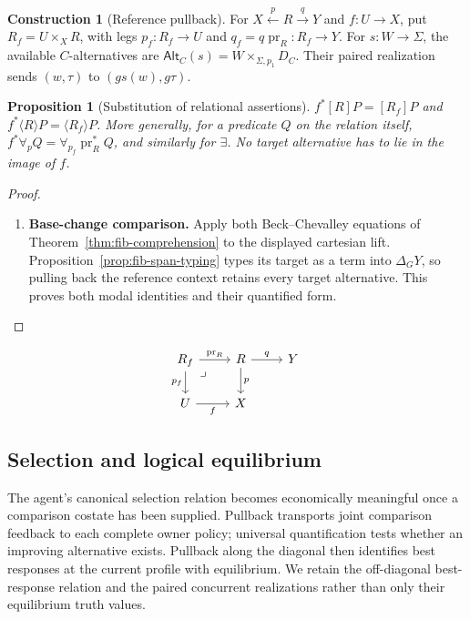 \documentclass[11pt,a4paper]{article}
\numberwithin{equation}{section}
\newtheorem{proposition}[theorem]{Proposition}
\theoremstyle{definition}
\newtheorem{construction}[construction]{Construction}
\theoremstyle{remark}
\theoremstyle{plain}
\begin{document}
\begin{construction}[Reference pullback]
For $X\xleftarrow pR\xrightarrow qY$ and $f:U\to X$, put
$R_f=U\times_XR$, with legs $p_f:R_f\to U$ and
$q_f=q\operatorname{pr}_R:R_f\to Y$.
For $s:W\to\Sigma$, the available $C$-alternatives are
$\mathsf{Alt}_C(s)=W\times_{\Sigma,p_1}D_C$.
Their paired realization sends $(w,\tau)$ to $(gs(w),g\tau)$.
\end{construction}

\begin{proposition}[Substitution of relational assertions]
\label{prop:egt-reference-bc}
$f^*[R]P=[R_f]P$ and
$f^*\langle R\rangle P=\langle R_f\rangle P$.
More generally, for a predicate $Q$ on the relation itself,
$f^*\forall_pQ=\forall_{p_f}\operatorname{pr}_R^*Q$, and similarly for
$\exists$. No target alternative has to lie in the image of $f$.
\end{proposition}
\begin{proof}
\leavevmode
\begin{enumerate}[label=\textup{(\arabic*)},leftmargin=*,itemsep=4pt,topsep=3pt]
  \item \textbf{Base-change comparison.} Apply both Beck--Chevalley equations of
Theorem~\ref{thm:fib-comprehension} to the displayed cartesian lift. Proposition~\ref{prop:fib-span-typing} types its target as a term into
$\Delta_GY$, so pulling back the reference context retains every target
alternative. This proves both modal identities and their quantified form.
\end{enumerate}
\end{proof}

\[
\begin{tikzcd}
 R_f\arrow[r,"\operatorname{pr}_R"]\arrow[d,"p_f"']
 \arrow[dr,phantom,"\lrcorner",very near start]&R\arrow[d,"p"]\arrow[r,"q"]&Y\\
 U\arrow[r,"f"']&X&
\end{tikzcd}
\]

\subsection{Selection and logical equilibrium}
\label{sec:egt-equilibrium}

The agent's canonical selection relation becomes economically meaningful
once a comparison costate has been supplied. Pullback transports joint
comparison feedback to each complete owner policy; universal
quantification tests whether an improving alternative exists. Pullback
along the diagonal then identifies best responses at the current profile
with equilibrium. We retain the off-diagonal best-response relation and
the paired concurrent realizations rather than only their equilibrium
truth values.
\end{document}

